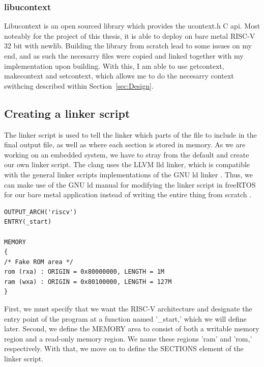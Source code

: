 \subsubsection*{libucontext}
Libucontext is an open sourced library which provides the ucontext.h C api. Most
noteably for the project of this thesis, it is able to deploy on bare metal
RISC-V 32 bit with newlib. Building the library from scratch lead to some issues
on my end, and as such the necesarry files were copied and linked together with
my implementation upon building. With this, I am able to use getcontext,
makecontext and setcontext, which allows me to do the necesarry context
swithcing described within Section~\ref{sec:Design}.


\subsection{Creating a linker script}
The linker script is used to tell the linker which parts of the file to include
in the final output file, as well as where each section is stored in memory. As
we are working on an embedded system, we have to stray from the default and
create our own linker script. The clang uses the LLVM lld linker, which is
compatible with the general linker scripts implementations of the GNU ld linker
\cite{llvm-org-linker}. Thus, we can make use of the GNU ld manual for modifying
the linker script in freeRTOS for our bare metal application instead of writing
the entire thing from scratch \cite{GNU-linker}.

\begin{lstlisting}
OUTPUT_ARCH('riscv')
ENTRY(_start)

MEMORY
{
/* Fake ROM area */
rom (rxa) : ORIGIN = 0x80000000, LENGTH = 1M
ram (wxa) : ORIGIN = 0x80100000, LENGTH = 127M
}
\end{lstlisting}
First, we must specify that we want the RISC-V architecture and designate the
entry point of the program at a function named '\_start,' which we will define
later. Second, we define the MEMORY area to consist of both a writable memory
region and a read-only memory region. We name these regions 'ram' and 'rom,'
respectively. With that, we move on to define the SECTIONS element of the linker
script.

